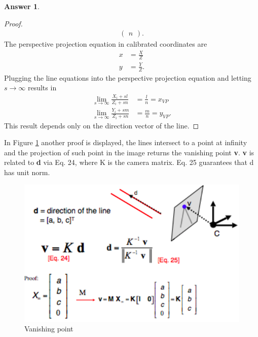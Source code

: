 \documentclass[a4paper,12 pt]{article}
\theoremstyle{definition}
\theoremstyle{remark}
\theoremstyle{definition}
\theoremstyle{definition}
\theoremstyle{definition}
\theoremstyle{definition}
\theoremstyle{remark}
\theoremstyle{remark}
\theoremstyle{definition}
\theoremstyle{definition}
\newtheorem*{answer}{Answer}
\begin{document}
\begin{enumerate}
\begin{enumerate}
\begin{answer}
\begin{proof}
\begin{equation}
\begin{split}
\begin{pmatrix}
n
\end{pmatrix}.
\end{split}
\end{equation}
The perspective projection equation in calibrated coordinates are
\begin{equation}
\begin{split}
x&=\frac{X}{Z}\\
y&=\frac{Y}{Z}.
\end{split}
\end{equation}
Plugging the line equations into the perspective projection equation and letting $s\rightarrow \infty$ results in
\begin{equation}
\begin{split}
\lim_{s\rightarrow \infty} \frac{X_i+sl}{Z_i+sn}&=\frac{l}{n}=x_{VP}\\
\lim_{s\rightarrow \infty} \frac{Y_i+sm}{Z_i+sn}&=\frac{m}{n}=y_{VP}.
\end{split}
\end{equation}
This result depends only on the direction vector of the line.
\end{proof}
\end{answer}
\end{enumerate}
In Figure \ref{fig:vanish} another proof is displayed, the lines intersect to a point at infinity and the projection of such point in the image returns the vanishing point \textbf{v}. \textbf{v} is related to \textbf{d} via Eq. 24, where K is the camera matrix. Eq. 25 guarantees that d has unit norm.\\
\begin{figure}[h!]
\begin{center}
\includegraphics[scale=0.4]{pics/vanish}
\caption{Vanishing point \label{fig:vanish}}
\end{center}
\end{figure}


\end{enumerate}
\end{document}
